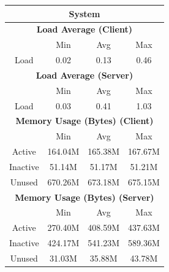 \documentclass[11pt,a4paper]{scrreprt}
\begin{document}
\begin{table}[H]
\centering
    \begin{tabular}{||c|c|c|c|c|c|c||}
    \hline
    \multicolumn{7}{|c|}{\textbf{System}} \\
    \hline
    \multicolumn{7}{|c|}{\textbf{Load Average (Client)}} \\
    \hline\hline
      & \multicolumn{2}{|c|}{Min} & \multicolumn{2}{|c|}{Avg} & \multicolumn{2}{|c|}{Max} \\
    \hline
    Load & \multicolumn{2}{|c|}{0.02} & \multicolumn{2}{|c|}{0.13} & \multicolumn{2}{|c|}{0.46} \\
    \hline\hline
    \multicolumn{7}{|c|}{\textbf{Load Average (Server)}} \\
    \hline\hline
      & \multicolumn{2}{|c|}{Min} & \multicolumn{2}{|c|}{Avg} & \multicolumn{2}{|c|}{Max} \\
    \hline
    Load & \multicolumn{2}{|c|}{0.03} & \multicolumn{2}{|c|}{0.41} & \multicolumn{2}{|c|}{1.03} \\
    \hline\hline
    \multicolumn{7}{|c|}{\textbf{Memory Usage (Bytes) (Client)}} \\
    \hline\hline
      & \multicolumn{2}{|c|}{Min} & \multicolumn{2}{|c|}{Avg} & \multicolumn{2}{|c|}{Max} \\
    \hline
    Active & \multicolumn{2}{|c|}{164.04M} & \multicolumn{2}{|c|}{165.38M} & \multicolumn{2}{|c|}{167.67M} \\
    \hline
    Inactive & \multicolumn{2}{|c|}{51.14M} & \multicolumn{2}{|c|}{51.17M} & \multicolumn{2}{|c|}{51.21M} \\
    \hline
    Unused & \multicolumn{2}{|c|}{670.26M} & \multicolumn{2}{|c|}{673.18M} & \multicolumn{2}{|c|}{675.15M} \\
    \hline\hline
    \multicolumn{7}{|c|}{\textbf{Memory Usage (Bytes) (Server)}} \\
    \hline\hline
      & \multicolumn{2}{|c|}{Min} & \multicolumn{2}{|c|}{Avg} & \multicolumn{2}{|c|}{Max} \\
    \hline
    Active & \multicolumn{2}{|c|}{270.40M} & \multicolumn{2}{|c|}{408.59M} & \multicolumn{2}{|c|}{437.63M} \\
    \hline
    Inactive & \multicolumn{2}{|c|}{424.17M} & \multicolumn{2}{|c|}{541.23M} & \multicolumn{2}{|c|}{589.36M} \\
    \hline
    Unused & \multicolumn{2}{|c|}{31.03M} & \multicolumn{2}{|c|}{35.88M} & \multicolumn{2}{|c|}{43.78M} \\
    \hline\hline

\end{tabular}
\end{table}
\end{document}
